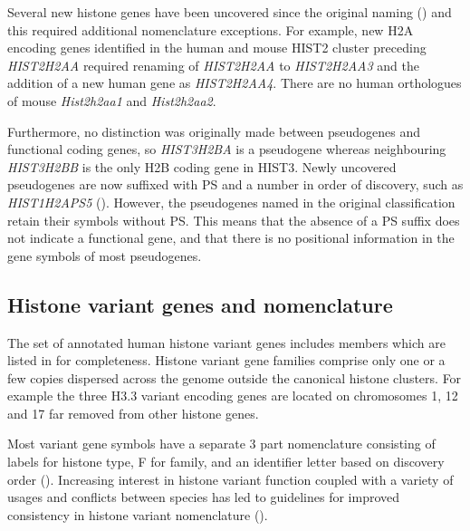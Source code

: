 	Several new histone genes have been uncovered since the original naming () 
	and this required additional nomenclature exceptions.
	For example, new H2A encoding genes identified in the human and mouse HIST2 cluster preceding \textit{HIST2H2AA} 
	required renaming of \textit{HIST2H2AA} to \textit{HIST2H2AA3} 
	and the addition of a new human gene as \textit{HIST2H2AA4}. 
	There are no human orthologues of mouse \textit{Hist2h2aa1} and \textit{Hist2h2aa2}.

	Furthermore, no distinction was originally made between pseudogenes and functional coding genes,
	so \textit{HIST3H2BA} is a pseudogene whereas neighbouring \textit{HIST3H2BB} is the only H2B coding gene in HIST3.
	Newly uncovered pseudogenes are now suffixed with PS and a number in order of discovery,
	such as \textit{HIST1H2APS5} (). 
	However, the pseudogenes named in the original classification retain their symbols without PS.
	This means that the absence of a PS suffix does not indicate a functional gene, 
	and that there is no positional information in the gene symbols of most pseudogenes.

\subsection{Histone variant genes and nomenclature}
	The set of annotated human histone variant genes 
	includes  members 
	which are listed in  for completeness.
	Histone variant gene families comprise only one or a few copies 
	dispersed across the genome outside the canonical histone clusters.
	For example the three H3.3 variant encoding genes are located 
	on chromosomes 1, 12 and 17 far removed from other histone genes.

	Most variant gene symbols have a separate 3 part nomenclature 
	consisting of labels for histone type, F for family, 
	and an identifier letter based on discovery order ().
	Increasing interest in histone variant function \citep{MazeAllis2014}
	coupled with a variety of usages and conflicts between species 
	has led to guidelines for improved consistency in histone variant nomenclature 
	\citep{Talbert2012} ().
